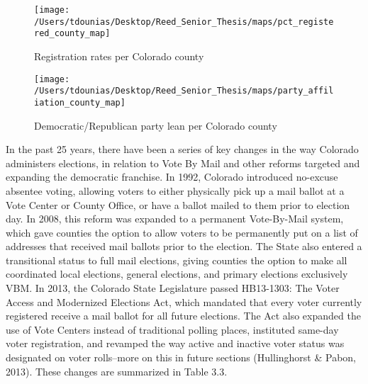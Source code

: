 \documentclass[12pt,twoside]{reedthesis}
\begin{document}
  \begin{figure}
  
  {\centering \texttt{[image: /Users/tdounias/Desktop/Reed\_Senior\_Thesis/maps/pct\_registered\_county\_map]} 
  
  }
  
  \caption[Registration rates per Colorado county]{Registration rates per Colorado county}\label{fig:reg per county map}
  \end{figure}
  
  \begin{figure}
  
  {\centering \texttt{[image: /Users/tdounias/Desktop/Reed\_Senior\_Thesis/maps/party\_affiliation\_county\_map]} 
  
  }
  
  \caption[Democratic/Republican party lean per Colorado county]{Democratic/Republican party lean per Colorado county}\label{fig:party reg per county map}
  \end{figure}
  
  In the past 25 years, there have been a series of key changes in the way
  Colorado administers elections, in relation to Vote By Mail and other
  reforms targeted and expanding the democratic franchise. In 1992,
  Colorado introduced no-excuse absentee voting, allowing voters to either
  physically pick up a mail ballot at a Vote Center or County Office, or
  have a ballot mailed to them prior to election day. In 2008, this reform
  was expanded to a permanent Vote-By-Mail system, which gave counties the
  option to allow voters to be permanently put on a list of addresses that
  received mail ballots prior to the election. The State also entered a
  transitional status to full mail elections, giving counties the option
  to make all coordinated local elections, general elections, and primary
  elections exclusively VBM. In 2013, the Colorado State Legislature
  passed HB13-1303: The Voter Access and Modernized Elections Act, which
  mandated that every voter currently registered receive a mail ballot for
  all future elections. The Act also expanded the use of Vote Centers
  instead of traditional polling places, instituted same-day voter
  registration, and revamped the way active and inactive voter status was
  designated on voter rolls--more on this in future sections (Hullinghorst
  \& Pabon, 2013). These changes are summarized in Table 3.3.
  
\end{document}
